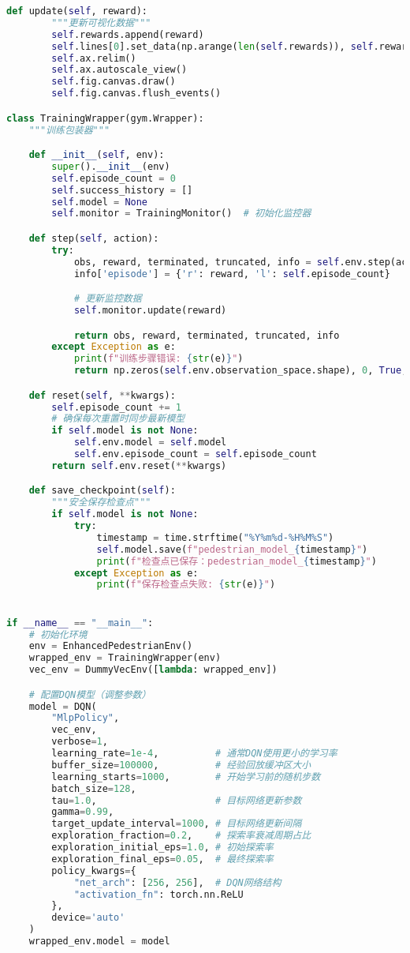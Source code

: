 \begin{lstlisting}[language=Python]
    def update(self, reward):
        """更新可视化数据"""
        self.rewards.append(reward)
        self.lines[0].set_data(np.arange(len(self.rewards)), self.rewards)
        self.ax.relim()
        self.ax.autoscale_view()
        self.fig.canvas.draw()
        self.fig.canvas.flush_events()

class TrainingWrapper(gym.Wrapper):
    """训练包装器"""

    def __init__(self, env):
        super().__init__(env)
        self.episode_count = 0
        self.success_history = []
        self.model = None
        self.monitor = TrainingMonitor()  # 初始化监控器

    def step(self, action):
        try:
            obs, reward, terminated, truncated, info = self.env.step(action)
            info['episode'] = {'r': reward, 'l': self.episode_count}

            # 更新监控数据
            self.monitor.update(reward)

            return obs, reward, terminated, truncated, info
        except Exception as e:
            print(f"训练步骤错误: {str(e)}")
            return np.zeros(self.env.observation_space.shape), 0, True, False, {}

    def reset(self, **kwargs):
        self.episode_count += 1
        # 确保每次重置时同步最新模型
        if self.model is not None:
            self.env.model = self.model
            self.env.episode_count = self.episode_count
        return self.env.reset(**kwargs)

    def save_checkpoint(self):
        """安全保存检查点"""
        if self.model is not None:
            try:
                timestamp = time.strftime("%Y%m%d-%H%M%S")
                self.model.save(f"pedestrian_model_{timestamp}")
                print(f"检查点已保存：pedestrian_model_{timestamp}")
            except Exception as e:
                print(f"保存检查点失败: {str(e)}")


if __name__ == "__main__":
    # 初始化环境
    env = EnhancedPedestrianEnv()
    wrapped_env = TrainingWrapper(env)
    vec_env = DummyVecEnv([lambda: wrapped_env])

    # 配置DQN模型（调整参数）
    model = DQN(
        "MlpPolicy",
        vec_env,
        verbose=1,
        learning_rate=1e-4,          # 通常DQN使用更小的学习率
        buffer_size=100000,          # 经验回放缓冲区大小
        learning_starts=1000,        # 开始学习前的随机步数
        batch_size=128,
        tau=1.0,                     # 目标网络更新参数
        gamma=0.99,
        target_update_interval=1000, # 目标网络更新间隔
        exploration_fraction=0.2,    # 探索率衰减周期占比
        exploration_initial_eps=1.0, # 初始探索率
        exploration_final_eps=0.05,  # 最终探索率
        policy_kwargs={
            "net_arch": [256, 256],  # DQN网络结构
            "activation_fn": torch.nn.ReLU
        },
        device='auto'
    )
    wrapped_env.model = model


\end{lstlisting}
